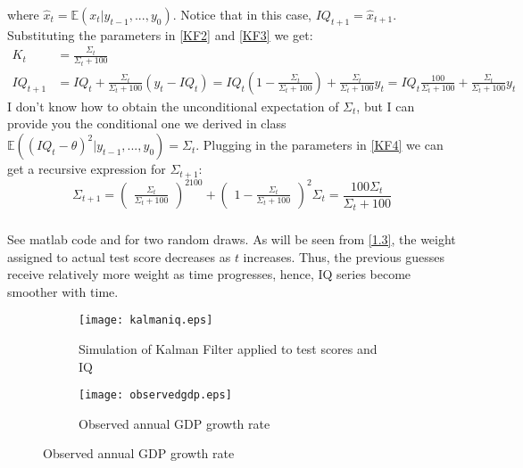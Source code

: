 \documentclass[]{article}
\begin{document}
where $\hat{x}_t = \mathbb{E}(x_t|y_{t-1}, ..., y_0)$. Notice that in this case, $IQ_{t+1} = \hat{x}_{t+1}$. Substituting the parameters in \eqref{KF2} and \eqref{KF3} we get:
\begin{equation}
\begin{split}
K_t& = \frac{\Sigma_t}{\Sigma_t + 100} \\\nonumber
IQ_{t+1}& = IQ_{t} + \frac{\Sigma_t}{\Sigma_t + 100}(y_t - IQ_t) = IQ_{t}(1 - \frac{\Sigma_t}{\Sigma_t + 100}) + \frac{\Sigma_t}{\Sigma_t + 100}y_t = IQ_t\frac{100}{\Sigma_t + 100} + \frac{\Sigma_t}{\Sigma_t + 100}y_t
\end{split}
\end{equation}
I don't know how to obtain the unconditional expectation of $\Sigma_t$, but I can provide you the conditional one we derived in class \smiley{}\\
$\mathbb{E}((IQ_t - \theta)^2|y_{t-1}, ..., y_0) = \Sigma_t$. Plugging in the parameters in \eqref{KF4} we can get a recursive expression for $\Sigma_{t+1}$:
\begin{equation}
\Sigma_{t+1} = \begin{pmatrix}\frac{\Sigma_t}{\Sigma_t + 100}\end{pmatrix}^2100 + \begin{pmatrix}1 - \frac{\Sigma_t}{\Sigma_t + 100}\end{pmatrix}^2\Sigma_t = \frac{100\Sigma_t}{\Sigma_t + 100} \nonumber
\end{equation}
	
\subsubsection{}
See matlab code and  for two random draws. As will be seen from \ref{1.3}, the weight assigned to actual test score decreases as $t$ increases. Thus, the previous guesses receive relatively more weight as time progresses, hence, IQ series become smoother with time.
\begin{figure}[h]
	\begin{subfigure}{0.5\textwidth}
		\centering
		\texttt{[image: kalmaniq.eps]}
		\caption{Simulation of Kalman Filter applied to test scores and IQ}
		\label{fig:kalmaniq}
	\end{subfigure}%
	\begin{subfigure}{0.5\textwidth}
		\centering
		\texttt{[image: observedgdp.eps]}
		\caption{Observed annual GDP growth rate}
		\label{fig:observedgdp}
	\end{subfigure}
\end{figure}
\end{document}
